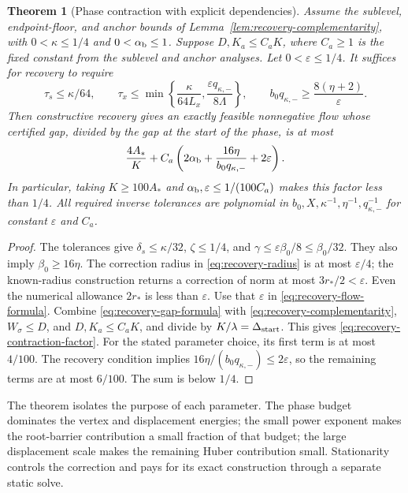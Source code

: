 \documentclass[11pt]{article}
\newtheorem{theorem}{Theorem}[section]
\theoremstyle{definition}\newtheorem{definition}[theorem]{Definition}
\theoremstyle{remark}\newtheorem{remark}[theorem]{Remark}
\begin{document}
\begin{theorem}[Phase contraction with explicit dependencies]
\label{thm:recovery-phase-contraction}
Assume the sublevel, endpoint-floor, and anchor bounds of
Lemma~\ref{lem:recovery-complementarity}, with $0<\kappa\le1/4$ and
$0<\alpha_{\rm b}\le1$.
Suppose $D,K_a\le C_aK$, where $C_a\ge1$ is the fixed constant from
the sublevel and anchor analyses. Let $0<\varepsilon\le1/4$.
It suffices for recovery to require
\begin{equation}\label{eq:recovery-clean-tolerances}
 \tau_s\le\kappa/64,\qquad
 \tau_x\le\min\left\{\frac{\kappa}{64L_x},
                  \frac{\varepsilon q_{\kappa,-}}{8\Lambda}\right\},
 \qquad
 b_0q_{\kappa,-}\ge\frac{8(\eta+2)}\varepsilon.
\end{equation}
Then constructive recovery gives an exactly feasible nonnegative flow
whose certified gap, divided by the gap at the start of the phase, is
at most
\begin{equation}\label{eq:recovery-contraction-factor}
 \frac{4A_*}{K}
 +C_a\left(2\alpha_{\rm b}
       +\frac{16\eta}{b_0q_{\kappa,-}}+2\varepsilon\right).
\end{equation}
In particular, taking $K\ge100A_*$ and
$\alpha_{\rm b},\varepsilon\le1/(100C_a)$ makes this factor less
than $1/4$. All required inverse tolerances are polynomial in
$b_0,X,\kappa^{-1},\eta^{-1},q_{\kappa,-}^{-1}$ for constant
$\varepsilon$ and $C_a$.
\end{theorem}

\begin{proof}
The tolerances give $\delta_s\le\kappa/32$, $\zeta\le1/4$, and
$\gamma\le\varepsilon\beta_0/8\le\beta_0/32$.
They also imply $\beta_0\ge16\eta$. The correction radius in
\eqref{eq:recovery-radius} is at most $\varepsilon/4$; the known-radius construction returns a correction of norm at most
$3r_*/2<\varepsilon$. Even the numerical allowance $2r_*$ is less
than $\varepsilon$. Use that $\varepsilon$ in
\eqref{eq:recovery-flow-formula}. Combine
\eqref{eq:recovery-gap-formula} with
\eqref{eq:recovery-complementarity}, $W_\sigma\le D$, and
$D,K_a\le C_aK$, and divide by $K/\lambda=\Delta_{\rm start}$.
This gives \eqref{eq:recovery-contraction-factor}.
For the stated parameter choice, its first term is at most $4/100$.
The recovery condition implies
$16\eta/(b_0q_{\kappa,-})\le2\varepsilon$, so the remaining terms
are at most $6/100$. The sum is below $1/4$.
\end{proof}

The theorem isolates the purpose of each parameter. The phase budget
dominates the vertex and displacement energies; the small power exponent
makes the root-barrier contribution a small fraction of that budget;
the large displacement scale makes the remaining Huber contribution
small. Stationarity controls the correction and pays for its exact
construction through a separate static solve.
\end{document}

